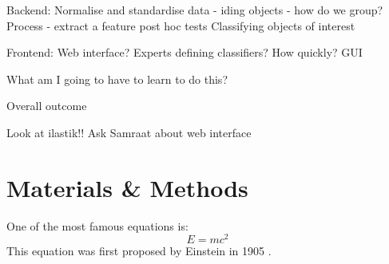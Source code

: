\documentclass[a4paper]{article}
\begin{document}
Backend:
Normalise and standardise data - iding objects - how do we group?
Process - extract a feature
post hoc tests
Classifying objects of interest


Frontend:
Web interface?
Experts defining classifiers?
How quickly?
GUI

What am I going to have to learn to do this?

Overall outcome


Look at ilastik!!
Ask Samraat about web interface



    
    
      
  \section{Materials \& Methods}
  One of the most famous equations is:
  \begin{equation}
    E = mc^2
  \end{equation}
  This equation was first proposed by Einstein in 1905 
  \cite{einstein1905does}.
  
  
  
\end{document}
